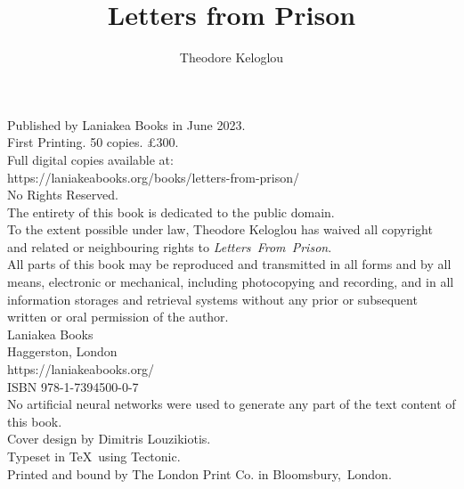 \documentclass{book}
\title{Letters from Prison}
\author{Theodore Keloglou}
\date{}
\begin{document}
\frontmatter %
\pagestyle{empty} %

\maketitle

\vspace*{\fill}
\begin{center}
{
    \small
    Published by Laniakea Books in June 2023.\\
    \vspace{1em}
    First Printing. 50 copies. £300.\\
    \vspace{1em}
    Full digital copies available at:\\
    https://laniakeabooks.org/books/letters-from-prison/\\
    \vspace{1em}
    No Rights Reserved.\\
    \vspace{1em}
    The entirety of this book is dedicated to the public domain.\\
    \vspace{1em}
    To the extent possible under law, Theodore Keloglou has waived all copyright and related or neighbouring rights to \textit{Letters~From~Prison}.\\
    \vspace{1em}
    All parts of this book may be reproduced and transmitted in all forms and by all means, electronic or mechanical, including photocopying and recording, and in all information storages and retrieval systems without any prior or subsequent written or oral permission of the author.\\
    \vspace{1em}
    Laniakea Books\\
    Haggerston, London\\
    https://laniakeabooks.org/\\
    \vspace{1em}
    ISBN 978-1-7394500-0-7\\
    \vspace{1em}
    No artificial neural networks were used to generate any part of the text content of this book.\\
    \vspace{1em}
    Cover design by Dimitris Louzikiotis.\\
    Typeset in \TeX\ using Tectonic.\\
    Printed and bound by The London Print Co. in Bloomsbury,~London.
}
\end{center}
\end{document}

